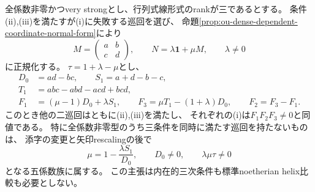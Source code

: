\begin{theorem}[全係数非零型の残余五係数族への帰着]
\label{thm:ou-dense-five-coefficient-residual}
全係数非零かつvery strongとし、行列式線形式のrankが三であるとする。
条件(ii),(iii)を満たすが(i)に失敗する巡回を選び、
命題\ref{prop:ou-dense-dependent-coordinate-normal-form}により
\[
 M=\begin{pmatrix}a&b\\c&d\end{pmatrix},\qquad
 N=\lambda\mathbf1+\mu M,\qquad \lambda\ne0
\]
に正規化する。
$\tau=1+\lambda-\mu$とし、
\[
 \begin{split}
 D_0&=ad-bc,\qquad S_1=a+d-b-c,\\
 T_1&=abc-abd-acd+bcd,\\
 F_1&=(\mu-1)D_0+\lambda S_1,\qquad
 F_3=\mu T_1-(1+\lambda)D_0,\qquad F_2=F_3-F_1.
 \end{split}
\]
このとき他の二巡回はともに(ii),(iii)を満たし、
それぞれの(i)は$F_1F_2F_3\ne0$と同値である。
特に全係数非零型のうち三条件を同時に満たす巡回を持たないものは、
添字の変更と矢印rescalingの後で
\[
 \mu=1-\frac{\lambda S_1}{D_0},\qquad
 D_0\ne0,\qquad\lambda\mu\tau\ne0
\]
となる五係数族に属する。
この主張は内在的三次条件も標準noetherian helix比較も必要としない。
\end{theorem}
